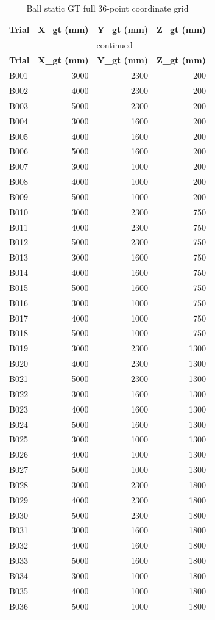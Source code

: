 \begin{longtable}{|l|r|r|r|}
\caption{Ball static GT full 36-point coordinate grid}
\label{tab:app_c_ball_grid}\\
\hline
\textbf{Trial} & \textbf{X\_gt (mm)} & \textbf{Y\_gt (mm)} & \textbf{Z\_gt (mm)} \\
\hline
\endfirsthead
\multicolumn{4}{c}{\tablename\ \thetable{} -- continued} \\
\hline
\textbf{Trial} & \textbf{X\_gt (mm)} & \textbf{Y\_gt (mm)} & \textbf{Z\_gt (mm)} \\
\hline
\endhead
B001 & 3000 & 2300 & 200 \\
\hline
B002 & 4000 & 2300 & 200 \\
\hline
B003 & 5000 & 2300 & 200 \\
\hline
B004 & 3000 & 1600 & 200 \\
\hline
B005 & 4000 & 1600 & 200 \\
\hline
B006 & 5000 & 1600 & 200 \\
\hline
B007 & 3000 & 1000 & 200 \\
\hline
B008 & 4000 & 1000 & 200 \\
\hline
B009 & 5000 & 1000 & 200 \\
\hline
B010 & 3000 & 2300 & 750 \\
\hline
B011 & 4000 & 2300 & 750 \\
\hline
B012 & 5000 & 2300 & 750 \\
\hline
B013 & 3000 & 1600 & 750 \\
\hline
B014 & 4000 & 1600 & 750 \\
\hline
B015 & 5000 & 1600 & 750 \\
\hline
B016 & 3000 & 1000 & 750 \\
\hline
B017 & 4000 & 1000 & 750 \\
\hline
B018 & 5000 & 1000 & 750 \\
\hline
B019 & 3000 & 2300 & 1300 \\
\hline
B020 & 4000 & 2300 & 1300 \\
\hline
B021 & 5000 & 2300 & 1300 \\
\hline
B022 & 3000 & 1600 & 1300 \\
\hline
B023 & 4000 & 1600 & 1300 \\
\hline
B024 & 5000 & 1600 & 1300 \\
\hline
B025 & 3000 & 1000 & 1300 \\
\hline
B026 & 4000 & 1000 & 1300 \\
\hline
B027 & 5000 & 1000 & 1300 \\
\hline
B028 & 3000 & 2300 & 1800 \\
\hline
B029 & 4000 & 2300 & 1800 \\
\hline
B030 & 5000 & 2300 & 1800 \\
\hline
B031 & 3000 & 1600 & 1800 \\
\hline
B032 & 4000 & 1600 & 1800 \\
\hline
B033 & 5000 & 1600 & 1800 \\
\hline
B034 & 3000 & 1000 & 1800 \\
\hline
B035 & 4000 & 1000 & 1800 \\
\hline
B036 & 5000 & 1000 & 1800 \\
\hline
\end{longtable}
